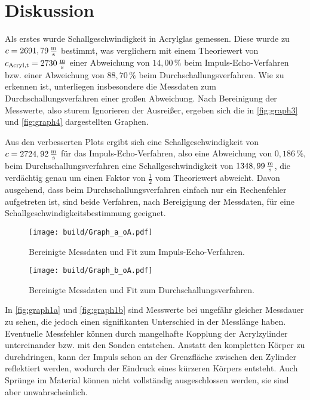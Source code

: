 \section{Diskussion}
\label{sec:Diskussion}
Als erstes wurde Schallgeschwindigkeit in Acrylglas gemessen.
Diese wurde zu $c = 2691,79 \,\unit{\frac{\meter}{\second}}$ bestimmt, was verglichern mit einem Theoriewert von
$c_{\text{Acryl},\text{t}} = 2730 \,\unit{\frac{\meter}{\second}} $ einer Abweichung von $14,00 \, \%$ beim Impuls-Echo-Verfahren 
bzw. einer Abweichung von $88,70 \, \%$ beim Durchschallungsverfahren. 
Wie zu erkennen ist, unterliegen insbesondere die Messdaten zum Durchschallungsverfahren einer großen Abweichung.
Nach Bereinigung der Messwerte, also sturem Ignorieren der Ausreißer, ergeben sich die in \autoref{fig:graph3} und \autoref{fig:graph4}
dargestellten Graphen.

Aus den verbesserten Plots ergibt sich eine Schallgeschwindigkeit von $c = 2724,92 \,\unit{\frac{\meter}{\second}}$ für das
Impuls-Echo-Verfahren, also eine Abweichung von $0,186 \,\%$, beim Durchschallungsverfahren eine Schallgeschwindigkeit von
$1348,99 \,\unit{\frac{\meter}{\second}}$, die verdächtig genau um einen Faktor von $\frac{1}{2}$ vom Theoriewert abweicht.
Davon ausgehend, dass beim Durchschallungsverfahren einfach nur ein Rechenfehler aufgetreten ist, sind beide Verfahren, nach
Bereigigung der Messdaten, für eine Schallgeschwindigkeitsbestimmung geeignet. \\

\begin{figure}[H]
    \centering
    \texttt{[image: build/Graph\_a\_oA.pdf]}
    \caption{Bereinigte Messdaten und Fit zum Impuls-Echo-Verfahren.}
    \label{fig:graph3}
\end{figure}

\begin{figure}[H]
    \centering
    \texttt{[image: build/Graph\_b\_oA.pdf]}
    \caption{Bereinigte Messdaten und Fit zum Durchschallungsverfahren.}
    \label{fig:graph4}
\end{figure}

In \autoref{fig:graph1a} und \autoref{fig:graph1b} sind Messwerte bei ungefähr gleicher Messdauer zu sehen, die jedoch einen signifikanten Unterschied in der Messlänge haben.
Eventuelle Messfehler können durch mangelhafte Kopplung der Acrylzylinder untereinander bzw. mit den Sonden entstehen.
Anstatt den kompletten Körper zu durchdringen, kann der Impuls schon an der Grenzfläche zwischen den Zylinder reflektiert werden,
wodurch der Eindruck eines kürzeren Körpers entsteht. 
Auch Sprünge im Material können nicht vollständig ausgeschlossen werden, sie sind aber unwahrscheinlich. \\


